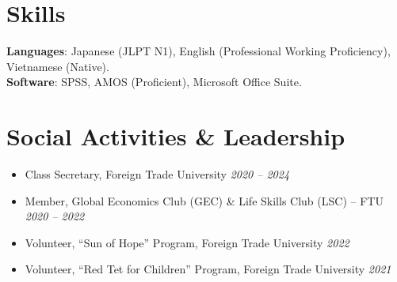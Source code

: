 \documentclass[12pt]{article}
\begin{document}
\section{Skills}
\textbf{Languages}: Japanese (JLPT N1), English (Professional Working Proficiency), Vietnamese (Native).\\
\textbf{Software}: SPSS, AMOS (Proficient), Microsoft Office Suite.

\section{Social Activities \& Leadership}
\begin{itemize}[leftmargin=*]
  \item Class Secretary, Foreign Trade University \hfill \emph{2020 -- 2024}
  \item Member, Global Economics Club (GEC) \& Life Skills Club (LSC) -- FTU \hfill \emph{2020 -- 2022}
  \item Volunteer, ``Sun of Hope'' Program, Foreign Trade University \hfill \emph{2022}
  \item Volunteer, ``Red Tet for Children'' Program, Foreign Trade University \hfill \emph{2021}
\end{itemize}
\end{document}
